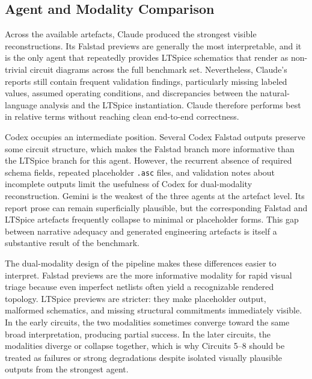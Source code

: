 \subsection{Agent and Modality Comparison}

Across the available artefacts, Claude produced the strongest visible reconstructions. Its Falstad previews are generally the most interpretable, and it is the only agent that repeatedly provides LTSpice schematics that render as non-trivial circuit diagrams across the full benchmark set. Nevertheless, Claude's reports still contain frequent validation findings, particularly missing labeled values, assumed operating conditions, and discrepancies between the natural-language analysis and the LTSpice instantiation. Claude therefore performs best in relative terms without reaching clean end-to-end correctness.

Codex occupies an intermediate position. Several Codex Falstad outputs preserve some circuit structure, which makes the Falstad branch more informative than the LTSpice branch for this agent. However, the recurrent absence of required schema fields, repeated placeholder \texttt{.asc} files, and validation notes about incomplete outputs limit the usefulness of Codex for dual-modality reconstruction. Gemini is the weakest of the three agents at the artefact level. Its report prose can remain superficially plausible, but the corresponding Falstad and LTSpice artefacts frequently collapse to minimal or placeholder forms. This gap between narrative adequacy and generated engineering artefacts is itself a substantive result of the benchmark.

The dual-modality design of the pipeline makes these differences easier to interpret. Falstad previews are the more informative modality for rapid visual triage because even imperfect netlists often yield a recognizable rendered topology. LTSpice previews are stricter: they make placeholder output, malformed schematics, and missing structural commitments immediately visible. In the early circuits, the two modalities sometimes converge toward the same broad interpretation, producing partial success. In the later circuits, the modalities diverge or collapse together, which is why Circuits 5--8 should be treated as failures or strong degradations despite isolated visually plausible outputs from the strongest agent.
